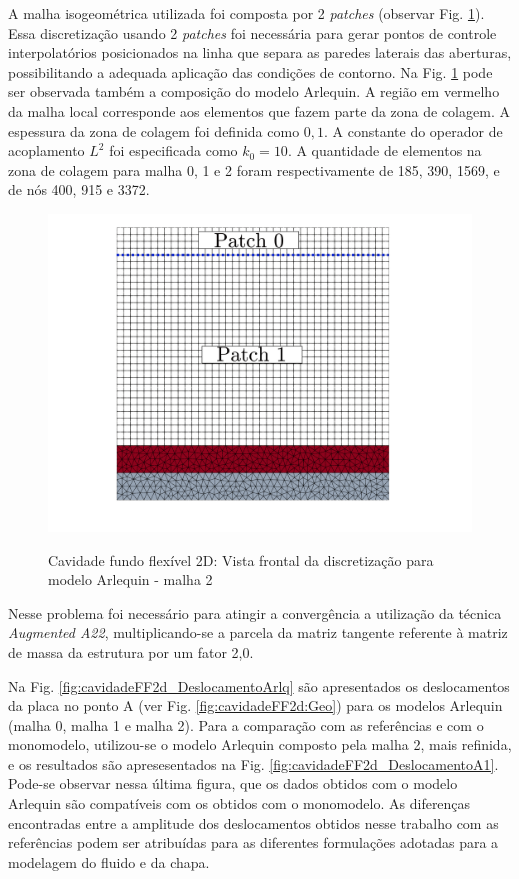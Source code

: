 \documentclass[tese_patricia]{subfiles}
\begin{document}
A malha isogeométrica utilizada foi composta por 2 \textit{patches} (observar Fig. \ref{fig:cavidadeFF2d:Malhas}). Essa discretização usando 2 \textit{patches} foi necessária para gerar pontos de controle interpolatórios posicionados na linha que separa as paredes laterais das aberturas, possibilitando a adequada aplicação das condições de contorno. Na Fig. \ref{fig:cavidadeFF2d:Malhas} pode ser observada também a composição do modelo Arlequin. A região em vermelho da malha local corresponde aos elementos que fazem parte da zona de colagem.  A espessura da zona de colagem foi definida como $0,1$. A constante do operador de acoplamento $L^{2}$ foi especificada como $k_{0} = 10$. A quantidade de elementos na zona de colagem para malha 0, 1 e 2  foram respectivamente de 185, 390, 1569, e de nós 400, 915 e 3372.

\begin{figure}[htb!]
	\centering
	{\includegraphics[scale=0.2,trim=0cm 2cm 0cm 0cm, clip=true]{Imagens/Cap7/Cav2dMesh.pdf}} 
	\caption{Cavidade fundo flexível 2D: Vista frontal da discretização para modelo Arlequin - malha 2}
	\label{fig:cavidadeFF2d:Malhas}
\end{figure}


Nesse problema foi necessário para atingir a convergência a utilização da técnica \textit{Augmented A22}, multiplicando-se a parcela da matriz tangente referente à matriz de massa da estrutura por um fator 2,0.

Na Fig. \ref{fig:cavidadeFF2d_DeslocamentoArlq} são apresentados os deslocamentos da placa no ponto A (ver Fig. \ref{fig:cavidadeFF2d:Geo}) para os modelos Arlequin (malha 0, malha 1 e malha 2). Para a comparação com as referências e com o monomodelo, utilizou-se o modelo Arlequin composto pela malha 2, mais refinida, e os resultados são apresesentados na Fig. \ref{fig:cavidadeFF2d_DeslocamentoA1}. Pode-se observar nessa última figura, que os dados obtidos com o modelo Arlequin são compatíveis com os obtidos com o monomodelo. As diferenças encontradas entre a amplitude dos deslocamentos obtidos nesse trabalho com as referências podem ser atribuídas para as diferentes formulações adotadas para a modelagem do fluido e da chapa.
\end{document}
